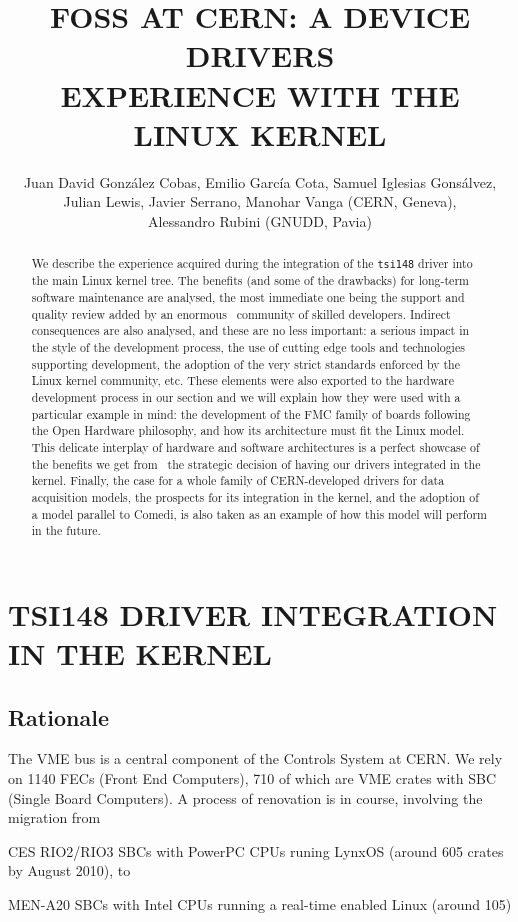 \documentclass{JAC2003}
\title{FOSS AT CERN: A DEVICE DRIVERS\\
	EXPERIENCE WITH THE LINUX KERNEL}
\author{%
	Juan David Gonz\'alez Cobas, Emilio Garc\'ia Cota,
	Samuel Iglesias Gons\'alvez,\\
	Julian Lewis, Javier Serrano, Manohar Vanga (CERN, Geneva),\\ 
	Alessandro Rubini (GNUDD, Pavia)}
\begin{document}
\maketitle
\begin{abstract}
    We describe the experience acquired during the integration of the
    \texttt{tsi148} driver
    into the main Linux kernel tree. The benefits (and some of the drawbacks) for
    long-term software maintenance are analysed, the most immediate one being the
    support and quality review added by an enormous  community of skilled
    developers. Indirect consequences are also analysed, and these are no less
    important: a serious impact in the style of the development process, the use of
    cutting edge tools and technologies supporting development, the adoption of the
    very strict standards enforced by the Linux kernel community, etc. These
    elements were also exported to the hardware development process in our section
    and we will explain how they were used with a particular example in mind: the
    development of the FMC family of boards following the Open Hardware philosophy,
    and how its architecture must fit the Linux model. This delicate interplay of
    hardware and software architectures is a perfect showcase of the benefits we
    get from  the strategic decision of having our drivers integrated in the
    kernel.  Finally, the case for a whole family of CERN-developed drivers for
    data acquisition models, the prospects for its integration in the kernel, and
    the adoption of a model parallel to Comedi, is also taken as an example of how
    this model will perform in the future.
\end{abstract}


\section{TSI148 DRIVER INTEGRATION IN THE KERNEL}
\subsection{Rationale}
The VME bus is a central component of the Controls System at CERN. We 
rely on 1140 FECs (Front End Computers), 710 of which are VME crates
with SBC (Single Board Computers). A process of renovation is in course,
involving the migration from 
\begin{Itemize}
\item CES RIO2/RIO3 SBCs with PowerPC CPUs runing LynxOS (around 605
    crates by August 2010), to
\item MEN-A20 SBCs with Intel CPUs running  a real-time enabled Linux
    (around 105)
\end{Itemize}
\end{document}
